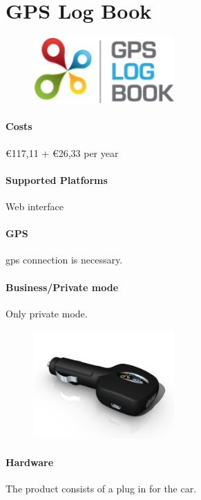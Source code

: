 \section{GPS Log Book}
\begin{figure}
  \begin{center}
    \includegraphics[width=0.48\textwidth]{bilder/GPSlogbook}
  \end{center}
\end{figure}
\paragraph{Costs} \euro 117,11 + \euro 26,33 per year
\paragraph{Supported Platforms} Web interface
\paragraph{GPS} \gls{gps} connection is necessary.
\paragraph{Business/Private mode} Only private mode.
\begin{figure}
  \begin{center}
    \includegraphics[width=0.48\textwidth]{bilder/GPSlogbook2}
  \end{center}
\end{figure}
\paragraph{Hardware}The product consists of a plug in for the car.
